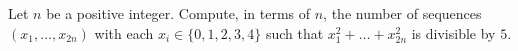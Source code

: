 Let $n$ be a positive integer. Compute, in terms of $n$, the number of sequences $(x_1,\ldots,x_{2n})$ with each $x_i\in\{0,1,2,3,4\}$ such that $x_1^2+\dots+x_{2n}^2$ is divisible by $5$.